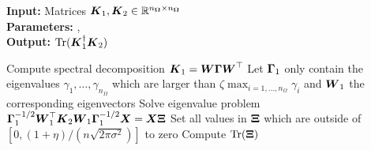 \hspace*{\algorithmicindent} \textbf{Input:} Matrices $\boldsymbol{K}_1, \boldsymbol{K}_2 \in \mathbb{R}^{n_{\boldsymbol{\Omega}} \times n_{\boldsymbol{\Omega}}}$ \\
\hspace*{\algorithmicindent} \textbf{Parameters:} , \\
\hspace*{\algorithmicindent} \textbf{Output:} $\operatorname{Tr}(\boldsymbol{K}_1^{\dagger} \boldsymbol{K}_2)$
\begin{algorithmic}[1]
    \State Compute spectral decomposition $\boldsymbol{K}_1 = \boldsymbol{W} \boldsymbol{\Gamma} \boldsymbol{W}^{\top}$
    \State Let $\boldsymbol{\Gamma}_1$ only contain the eigenvalues $\gamma_1, \dots, \gamma_{n_{\Omega}}$ which are larger than $\zeta \max_{i=1, \dots, n_{\Omega}} \gamma_i$ and $\boldsymbol{W}_1$ the corresponding eigenvectors
    \State Solve eigenvalue problem $\boldsymbol{\Gamma}_1^{-1/2} \boldsymbol{W}_1^{\top} \boldsymbol{K}_2 \boldsymbol{W}_1 \boldsymbol{\Gamma}_1^{-1/2} \boldsymbol{X} = \boldsymbol{X} \boldsymbol{\Xi}$
    \State Set all values in $\boldsymbol{\Xi}$ which are outside of $[0, (1 + \eta) / (n \sqrt{2 \pi \sigma^2})]$ to zero
    \State Compute $\operatorname{Tr}(\boldsymbol{\Xi})$
\end{algorithmic}
